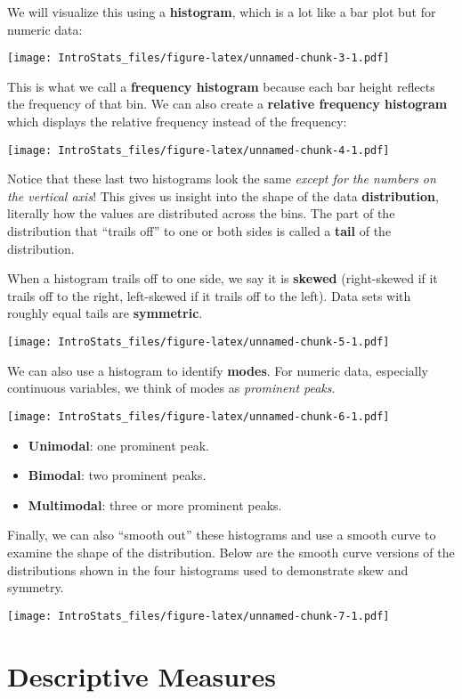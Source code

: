\documentclass[
]{book}
\providecommand{\tightlist}{%
  \setlength{\itemsep}{0pt}\setlength{\parskip}{0pt}}
\begin{document}
We will visualize this using a \textbf{histogram}, which is a lot like a bar plot but for numeric data:

\texttt{[image: IntroStats\_files/figure-latex/unnamed-chunk-3-1.pdf]}

This is what we call a \textbf{frequency histogram} because each bar height reflects the frequency of that bin. We can also create a \textbf{relative frequency histogram} which displays the relative frequency instead of the frequency:

\texttt{[image: IntroStats\_files/figure-latex/unnamed-chunk-4-1.pdf]}

Notice that these last two histograms look the same \emph{except for the numbers on the vertical axis}! This gives us insight into the shape of the data \textbf{distribution}, literally how the values are distributed across the bins. The part of the distribution that ``trails off'' to one or both sides is called a \textbf{tail} of the distribution.

When a histogram trails off to one side, we say it is \textbf{skewed} (right-skewed if it trails off to the right, left-skewed if it trails off to the left). Data sets with roughly equal tails are \textbf{symmetric}.

\texttt{[image: IntroStats\_files/figure-latex/unnamed-chunk-5-1.pdf]}

We can also use a histogram to identify \textbf{modes}. For numeric data, especially continuous variables, we think of modes as \emph{prominent peaks}.

\texttt{[image: IntroStats\_files/figure-latex/unnamed-chunk-6-1.pdf]}

\begin{itemize}
\tightlist
\item
  \textbf{Unimodal}: one prominent peak.
\item
  \textbf{Bimodal}: two prominent peaks.
\item
  \textbf{Multimodal}: three or more prominent peaks.
\end{itemize}

Finally, we can also ``smooth out'' these histograms and use a smooth curve to examine the shape of the distribution. Below are the smooth curve versions of the distributions shown in the four histograms used to demonstrate skew and symmetry.

\texttt{[image: IntroStats\_files/figure-latex/unnamed-chunk-7-1.pdf]}

\hypertarget{descriptive-measures}{%
\chapter{Descriptive Measures}\label{descriptive-measures}}
\end{document}
